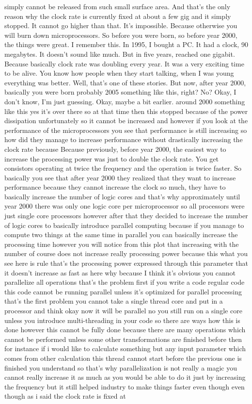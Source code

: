 simply cannot be released from such small surface area. And that's the only reason why the clock rate is currently fixed at about a few gig and it simply stopped. It cannot go higher than that. It's impossible. Because otherwise you will burn down microprocessors. So before you were born, so before year 2000, the things were great. I remember this. In 1995, I bought a PC. It had a clock, 90 megabytes. It doesn't sound like much. But in five years, reached one gigabit. Because basically clock rate was doubling every year. It was a very exciting time to be alive. You know how people when they start talking, when I was young everything was better. Well, that's one of these stories. But now, after year 2000, basically you were born probably 2005 something like this, right? No? Okay, I don't know, I'm just guessing. Okay, maybe a bit earlier. around 2000 something like this yes it's over there so at that time then this stopped because of the power dissipation unfortunately so it cannot be increased and however if you look at the performance of the microprocessors you see that performance is still increasing so how did they manage to increase performance without drastically increasing the clock rate because Because previously, before year 2000, the easiest way to increase the processing power was just to double the clock rate. You get consistors operating at twice the frequency and the operation is twice faster. So basically you see that after year 2000 they realized that they want to increase performance because they cannot increase the clock so much, they have to basically increase the number of logic cores and that's why approximately until year 2000 there was only one logic core per microprocessor so all processors were just single core processors however after that they decided to increase the number of logic cores to basically introduce parallel computing because if you manage to compute two things at the same time in parallel you can basically increase the processing time however you will notice from this plot that increasing with the number of course does not increase really processing power because this what you see here is rule that's the processing power expressed through this parameter that it doesn't increase as fast as here why because I think it's obvious you cannot parallelize all operations that's the problem first if you write a code regular code this code cannot be running parallel unless it's optimized for parallel processing that's the first problem you cannot take a single thread core and put in a processor and think okay now it will be parallel no you still run on a single core unless you introduce multi-threading in your code so there are ways how this is done however this cannot be fully done because there are many operations which cannot be performed unless some other transformations are finished before then for instance if i would like to calculate something but any input parameter which comes from other calculation this thread cannot start before the previous one is finished you understand so that's why parallelization is not really a magic you cannot really increase it as much as you would be able to do it just by increasing the frequency but it still helped industry to make things faster even though even though as i said the clock rate is fixed at 